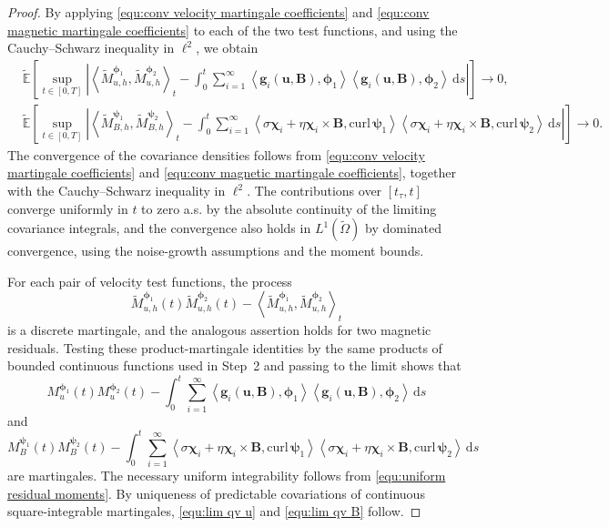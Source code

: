 \documentclass[11pt, reqno]{amsart}
\theoremstyle{definition}
\numberwithin{equation}{section}
\newcommand{\curl}{\mathrm{curl}\,}
\newcommand{\bff}{\boldsymbol}
\newcommand{\bb}{\mathbb}
\newcommand{\ds}{\,\mathrm{d}s}
\newcommand{\inpro}[2]{\left\langle#1,#2\right\rangle}
\newcommand{\abs}[1]{\left|{#1}\right|}
\begin{document}
\begin{proof}
	By applying
	\eqref{equ:conv velocity martingale coefficients} and
	\eqref{equ:conv magnetic martingale coefficients} to each of the two
	test functions, and using the Cauchy--Schwarz inequality in $\ell^2$,
	we obtain
	\begin{align*}
		&\widetilde{\bb E}\left[
		\sup_{t\in[0,T]}
		\abs{
			\left\langle
			\widetilde M_{u,h}^{\bff\phi_1},
			\widetilde M_{u,h}^{\bff\phi_2}
			\right\rangle_t
			-
			\int_0^t
			\sum_{i=1}^{\infty}
			\inpro{\bff g_i(\bff u,\bff B)}{\bff\phi_1}
			\inpro{\bff g_i(\bff u,\bff B)}{\bff\phi_2}
			\ds
		}
		\right]
		\longrightarrow0,
		\\
		&\widetilde{\bb E}\left[
		\sup_{t\in[0,T]}
		\abs{
			\left\langle
			\widetilde M_{B,h}^{\bff\psi_1},
			\widetilde M_{B,h}^{\bff\psi_2}
			\right\rangle_t
			-
			\int_0^t
			\sum_{i=1}^{\infty}
			\inpro{
				\sigma\bff\chi_i+\eta\bff\chi_i\times\bff B}
			{\curl\bff\psi_1}
			\inpro{
				\sigma\bff\chi_i+\eta\bff\chi_i\times\bff B}
			{\curl\bff\psi_2}
			\ds
		}
		\right]
		\longrightarrow0.
	\end{align*}
	The convergence of the covariance densities follows from
	\eqref{equ:conv velocity martingale coefficients} and
	\eqref{equ:conv magnetic martingale coefficients}, together with the
	Cauchy--Schwarz inequality in $\ell^2$. The contributions over $[t_\tau,t]$ converge uniformly in $t$ to zero a.s. by the absolute continuity of the limiting covariance integrals, and the convergence also holds in $L^1(\widetilde\Omega)$ by dominated convergence, using the noise-growth assumptions and the moment bounds.
	
	For each pair of velocity test functions, the process
	\[
	\widetilde M_{u,h}^{\bff\phi_1}(t)
	\widetilde M_{u,h}^{\bff\phi_2}(t)
	-
	\left\langle
	\widetilde M_{u,h}^{\bff\phi_1},
	\widetilde M_{u,h}^{\bff\phi_2}
	\right\rangle_t
	\]
	is a discrete martingale, and the analogous assertion holds for two
	magnetic residuals. Testing these product-martingale identities by the same
	products of bounded continuous functions used in Step~2 and passing to
	the limit shows that
	\[
	M_u^{\bff\phi_1}(t)M_u^{\bff\phi_2}(t)
	-
	\int_0^t
	\sum_{i=1}^{\infty}
	\inpro{\bff g_i(\bff u,\bff B)}{\bff\phi_1}
	\inpro{\bff g_i(\bff u,\bff B)}{\bff\phi_2}
	\ds
	\]
	and
	\[
	M_B^{\bff\psi_1}(t)M_B^{\bff\psi_2}(t)
	-
	\int_0^t
	\sum_{i=1}^{\infty}
	\inpro{
		\sigma\bff\chi_i+\eta\bff\chi_i\times\bff B}
	{\curl\bff\psi_1}
	\inpro{
		\sigma\bff\chi_i+\eta\bff\chi_i\times\bff B}
	{\curl\bff\psi_2}
	\ds
	\]
	are martingales. The necessary uniform integrability follows from
	\eqref{equ:uniform residual moments}. By uniqueness of predictable
	covariations of continuous square-integrable martingales,
	\eqref{equ:lim qv u} and \eqref{equ:lim qv B} follow.
	

\end{proof}
\end{document}
